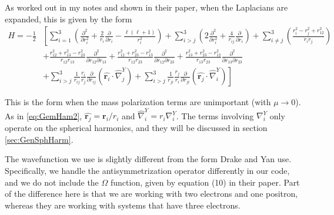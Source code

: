 \documentclass[Dissertation.tex]{subfiles}
\begin{document}
\noindent As worked out in my notes and shown in their paper, when the Laplacians are expanded, this is given by the form
\begin{align}
\label{eq:GenHam2}
\nonumber H = -\frac{1}{2} & \left[ \sum_{i=1}^3 \left( \frac{\partial^2}{\partial r_i^2} + \frac{2}{r_i} \frac{\partial}{\partial r_i} - \frac{\ell(\ell+1)}{r_i^2} \right) + \sum_{i>j}^3 \left( 2 \frac{\partial^2}{\partial r_i^2} + \frac{4}{r_{ij}} \frac{\partial}{\partial r_i} \right) + \sum_{i \neq j}^3 \left(\frac{r_i^2 - r_j^2 + r_{12}^2}{r_i r_j} \right) \right. \\
\nonumber &  \left. + \frac{r_{12}^2 + r_{13}^2 - r_{23}^2}{r_{12} r_{13}} \frac{\partial^2}{\partial r_{12} \partial r_{13}} + \frac{r_{12}^2 + r_{23}^2 - r_{13}^2}{r_{12} r_{23}} \frac{\partial^2}{\partial r_{12} \partial r_{23}} + \frac{r_{13}^2 + r_{23}^2 - r_{12}^2}{r_{13} r_{23}} \frac{\partial^2}{\partial r_{13} \partial r_{23}} \right. \\
& \left. + \sum_{i>j}^3 \frac{1}{r_{ij}} \frac{r_i}{r_j} \frac{\partial}{\partial r_{ij}} \left( \hat{\boldsymbol{r}_i} \cdot \hat{\nabla}_j^Y \right) + \sum_{i>j}^3 \frac{1}{r_{ji}} \frac{r_j}{r_i} \frac{\partial}{\partial r_{ji}} \left( \hat{\boldsymbol{r}_j} \cdot \hat{\nabla}_i^Y \right) \right]
\end{align}

\noindent This is the form when the mass polarization terms are unimportant (with $\mu \rightarrow 0$). As in \ref{eq:GemHam2}, $\hat{\boldsymbol{r}_j} = \boldsymbol{r}_i/r_i$ and $\hat{\nabla}_i^Y = r_i \nabla_i^Y$. The terms involving $\nabla_i^Y$ only operate on the spherical harmonics, and they will be discussed in section \ref{sec:GenSphHarm}.

The wavefunction we use is slightly different from the form Drake and Yan use. Specifically, we handle the antisymmetrization operator differently in our code, and we do not include the $\Omega$ function, given by equation (10) in their paper. Part of the difference here is that we are working with two electrons and one positron, whereas they are working with systems that have three electrons.
\end{document}

